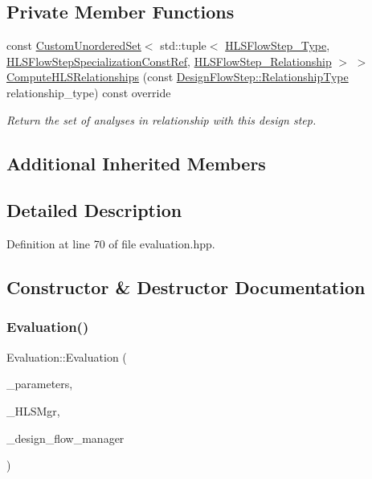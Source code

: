 \subsection*{Private Member Functions}
\begin{DoxyCompactItemize}
\item 
const \hyperlink{classCustomUnorderedSet}{Custom\+Unordered\+Set}$<$ std\+::tuple$<$ \hyperlink{hls__step_8hpp_ada16bc22905016180e26fc7e39537f8d}{H\+L\+S\+Flow\+Step\+\_\+\+Type}, \hyperlink{hls__step_8hpp_a5fdd2edf290c196531d21d68e13f0e74}{H\+L\+S\+Flow\+Step\+Specialization\+Const\+Ref}, \hyperlink{hls__step_8hpp_a3ad360b9b11e6bf0683d5562a0ceb169}{H\+L\+S\+Flow\+Step\+\_\+\+Relationship} $>$ $>$ \hyperlink{classEvaluation_a6a87bfae16ed93582db98d99b4c48403}{Compute\+H\+L\+S\+Relationships} (const \hyperlink{classDesignFlowStep_a723a3baf19ff2ceb77bc13e099d0b1b7}{Design\+Flow\+Step\+::\+Relationship\+Type} relationship\+\_\+type) const override
\begin{DoxyCompactList}\small\item\em Return the set of analyses in relationship with this design step. \end{DoxyCompactList}\end{DoxyCompactItemize}
\subsection*{Additional Inherited Members}


\subsection{Detailed Description}


Definition at line 70 of file evaluation.\+hpp.



\subsection{Constructor \& Destructor Documentation}
\mbox{\label{classEvaluation_a0496e2964ae3d73fe1a255526a8f4ee1}} 
\subsubsection{\texorpdfstring{Evaluation()}{Evaluation()}}
{\footnotesize\ttfamily Evaluation\+::\+Evaluation (\begin{DoxyParamCaption}\item[{const \hyperlink{Parameter_8hpp_a37841774a6fcb479b597fdf8955eb4ea}{Parameter\+Const\+Ref}}]{\+\_\+parameters,  }\item[{const \hyperlink{hls__manager_8hpp_acd3842b8589fe52c08fc0b2fcc813bfe}{H\+L\+S\+\_\+manager\+Ref}}]{\+\_\+\+H\+L\+S\+Mgr,  }\item[{const Design\+Flow\+Manager\+Const\+Ref}]{\+\_\+design\+\_\+flow\+\_\+manager }\end{DoxyParamCaption})}



